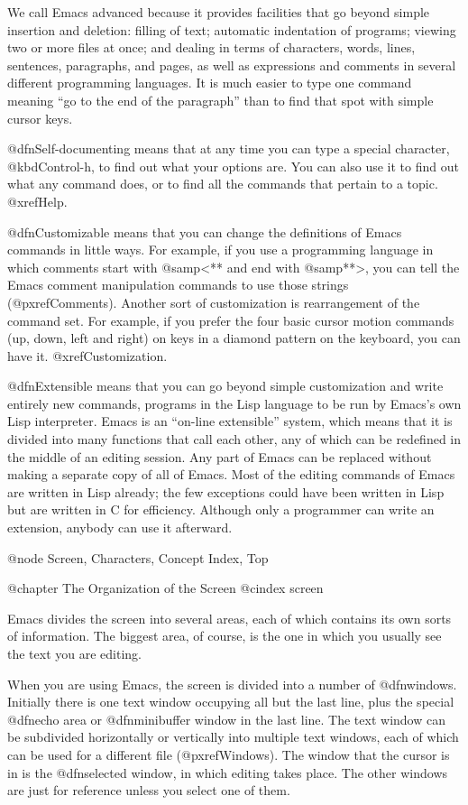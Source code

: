   We call Emacs advanced because it provides facilities that go beyond
simple insertion and deletion: filling of text; automatic indentation of
programs; viewing two or more files at once; and dealing in terms of
characters, words, lines, sentences, paragraphs, and pages, as well as
expressions and comments in several different programming languages.  It is
much easier to type one command meaning ``go to the end of the paragraph''
than to find that spot with simple cursor keys.

  @dfn{Self-documenting} means that at any time you can type a special
character, @kbd{Control-h}, to find out what your options are.  You can
also use it to find out what any command does, or to find all the commands
that pertain to a topic.  @xref{Help}.

  @dfn{Customizable} means that you can change the definitions of Emacs
commands in little ways.  For example, if you use a programming language in
which comments start with @samp{<**} and end with @samp{**>}, you can tell
the Emacs comment manipulation commands to use those strings
(@pxref{Comments}).  Another sort of customization is rearrangement of the
command set.  For example, if you prefer the four basic cursor motion
commands (up, down, left and right) on keys in a diamond pattern on the
keyboard, you can have it.  @xref{Customization}.

  @dfn{Extensible} means that you can go beyond simple customization and
write entirely new commands, programs in the Lisp language to be run by
Emacs's own Lisp interpreter.  Emacs is an ``on-line extensible'' system,
which means that it is divided into many functions that call each other,
any of which can be redefined in the middle of an editing session.  Any
part of Emacs can be replaced without making a separate copy of all of
Emacs.  Most of the editing commands of Emacs are written in Lisp already;
the few exceptions could have been written in Lisp but are written in C for
efficiency.  Although only a programmer can write an extension, anybody can
use it afterward.

@node Screen, Characters, Concept Index, Top

@chapter The Organization of the Screen
@cindex screen

  Emacs divides the screen into several areas, each of which contains
its own sorts of information.  The biggest area, of course, is the one
in which you usually see the text you are editing.

  When you are using Emacs, the screen is divided into a number of
@dfn{windows}.  Initially there is one text window occupying all but the
last line, plus the special @dfn{echo area} or @dfn{minibuffer window} in
the last line.  The text window can be subdivided horizontally or
vertically into multiple text windows, each of which can be used for a
different file (@pxref{Windows}).  The window that the cursor is in is the
@dfn{selected window}, in which editing takes place.  The other windows are
just for reference unless you select one of them.

